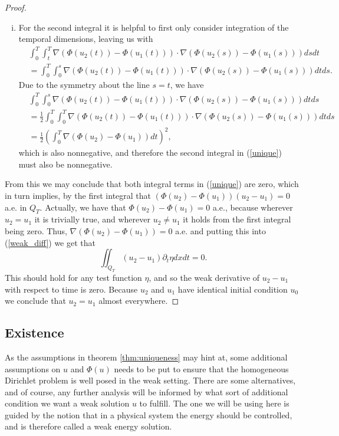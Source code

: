 \documentclass[11pt, a4paper]{article}
\begin{document}
\begin{proof}
\begin{enumerate}[i)]
	\item For the second integral it is helpful to first only consider integration of the temporal dimensions, leaving us with
	\begin{align*}
	&\int_0^T\int_t^T \nabla(\Phi(u_2(t)) - \Phi(u_1(t)))\cdot \nabla(\Phi(u_2(s))-\Phi(u_1(s)))dsdt \\
	&= \int_0^T\int_0^s\nabla(\Phi(u_2(t)) - \Phi(u_1(t)))\cdot \nabla(\Phi(u_2(s))-\Phi(u_1(s)))dtds.
	\end{align*}
	Due to the symmetry about the line $s=t$, we have
	\begin{align*}
	&\int_0^T\int_0^s\nabla(\Phi(u_2(t)) - \Phi(u_1(t)))\cdot \nabla(\Phi(u_2(s))-\Phi(u_1(s)))dtds \\
	&= \frac{1}{2}\int_0^T \int_0^T \nabla(\Phi(u_2(t)) - \Phi(u_1(t)))\cdot \nabla(\Phi(u_2(s))-\Phi(u_1(s)))dtds \\
	&= \frac{1}{2}\left( \int_0^T \nabla(\Phi(u_2)-\Phi(u_1))dt\right)^2,
	\end{align*}
	which is also nonnegative, and therefore the second integral in (\ref{unique}) must also be nonnegative.
\end{enumerate}
From this we may conclude that both integral terms in (\ref{unique}) are zero, which in turn implies, by the first integral that $(\Phi(u_2)-\Phi(u_1))(u_2 - u_1) = 0$ a.e. in $Q_T$. Actually, we have that $\Phi(u_2) - \Phi(u_1) = 0$ a.e., because wherever $u_2 = u_1$ it is trivially true, and wherever $ u_2 \neq u_1$ it holds from the first integral being zero. Thus, $ \nabla (\Phi(u_2) - \Phi(u_1) ) = 0$ a.e. and putting this into (\ref{weak_diff}) we get that
\begin{equation*}
\iint_{Q_T}(u_2 - u_1)\partial_t \eta dx dt = 0.
\end{equation*}
This should hold for any test function $\eta$, and so the weak derivative of $u_2 - u_1$ with respect to time is zero. Because $u_2$ and $u_1$ have identical initial condition $u_0$ we conclude that $u_2 = u_1$ almost everywhere.
\end{proof}

\subsection{Existence}
As the assumptions in theorem \ref{thm:uniqueness} may hint at, some additional assumptions on $u$ and $\Phi(u)$ needs to be put to ensure that the homogeneous Dirichlet problem is well posed in the weak setting. There are some alternatives, and of course, any further analysis will be informed by what sort of additional condition we want a weak solution $u$ to fulfill. The one we will be using here is guided by the notion that in a physical system the energy should be controlled, and is therefore called a weak energy solution. 
\end{document}
